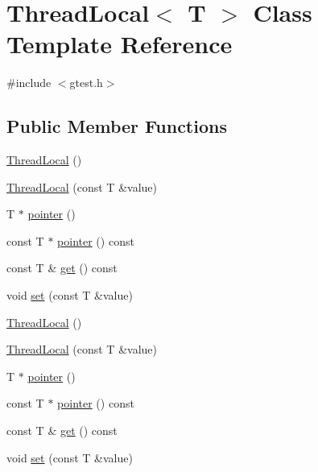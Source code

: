\hypertarget{classtesting_1_1internal_1_1ThreadLocal}{\section{\-Thread\-Local$<$ \-T $>$ \-Class \-Template \-Reference}
\label{d4/d47/classtesting_1_1internal_1_1ThreadLocal}
}


{\ttfamily \#include $<$gtest.\-h$>$}

\subsection*{\-Public \-Member \-Functions}
\begin{DoxyCompactItemize}
\item 
\hyperlink{classtesting_1_1internal_1_1ThreadLocal_a29759b045add7cf2215a0bd2ab2c70db}{\-Thread\-Local} ()
\item 
\hyperlink{classtesting_1_1internal_1_1ThreadLocal_ad9f003ffe909d9c44360041524ac3001}{\-Thread\-Local} (const \-T \&value)
\item 
\-T $\ast$ \hyperlink{classtesting_1_1internal_1_1ThreadLocal_af8cafc8f330a0ca9e7097b5b4bf60423}{pointer} ()
\item 
const \-T $\ast$ \hyperlink{classtesting_1_1internal_1_1ThreadLocal_ab86a650a6f01272cb1961c719ca18d6c}{pointer} () const 
\item 
const \-T \& \hyperlink{classtesting_1_1internal_1_1ThreadLocal_a5483146ccae665a5ac9dbe92d47d6f0e}{get} () const 
\item 
void \hyperlink{classtesting_1_1internal_1_1ThreadLocal_a0f806efa754adc9f722b43aabba42dd4}{set} (const \-T \&value)
\item 
\hyperlink{classtesting_1_1internal_1_1ThreadLocal_a29759b045add7cf2215a0bd2ab2c70db}{\-Thread\-Local} ()
\item 
\hyperlink{classtesting_1_1internal_1_1ThreadLocal_ad9f003ffe909d9c44360041524ac3001}{\-Thread\-Local} (const \-T \&value)
\item 
\-T $\ast$ \hyperlink{classtesting_1_1internal_1_1ThreadLocal_af8cafc8f330a0ca9e7097b5b4bf60423}{pointer} ()
\item 
const \-T $\ast$ \hyperlink{classtesting_1_1internal_1_1ThreadLocal_ab86a650a6f01272cb1961c719ca18d6c}{pointer} () const 
\item 
const \-T \& \hyperlink{classtesting_1_1internal_1_1ThreadLocal_a5483146ccae665a5ac9dbe92d47d6f0e}{get} () const 
\item 
void \hyperlink{classtesting_1_1internal_1_1ThreadLocal_a0f806efa754adc9f722b43aabba42dd4}{set} (const \-T \&value)
\end{DoxyCompactItemize}
